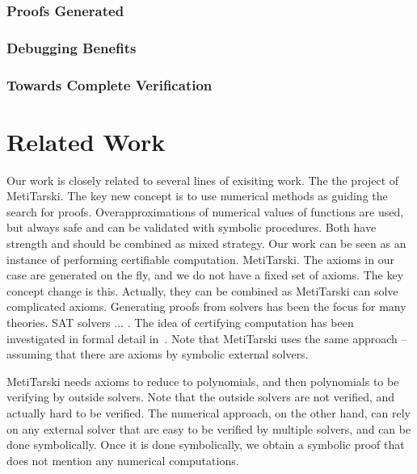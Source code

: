 \documentclass[envcountsect]{llncs}
\begin{document}


\subsubsection{Proofs Generated}



\subsubsection{Debugging Benefits}


\subsubsection{Towards Complete Verification}




\section{Related Work}\label{related}

Our work is closely related to several lines of exisiting work. The the
project of MetiTarski. The key new concept is to use numerical methods as
guiding the search for proofs. Overapproximations of numerical values of
functions are used, but always safe and can be validated with symbolic
procedures. Both have strength and should be combined as mixed strategy. Our
work can be seen as an instance of performing certifiable computation.
MetiTarski. The axioms in our case are generated on the fly, and we do not have
a fixed set of axioms. The key concept change is this. Actually, they can be
combined as MetiTarski can solve
complicated axioms. 
Generating proofs from solvers has been the focus for
many theories. SAT solvers ... . The idea of certifying computation has been
investigated in formal detail in~\cite{}. Note that MetiTarski uses the same
approach -- assuming that there are axioms by symbolic external solvers. 

MetiTarski needs axioms to reduce to polynomials, and then polynomials to be
verifying by outside solvers. Note that the outside solvers are not verified,
and actually hard to be verified. The numerical approach, on the other hand,
can rely on any external solver that are easy to be verified by multiple
solvers, and can be done symbolically. Once it is done symbolically, we obtain
a symbolic proof that does not mention any numerical computations. 
\end{document}
